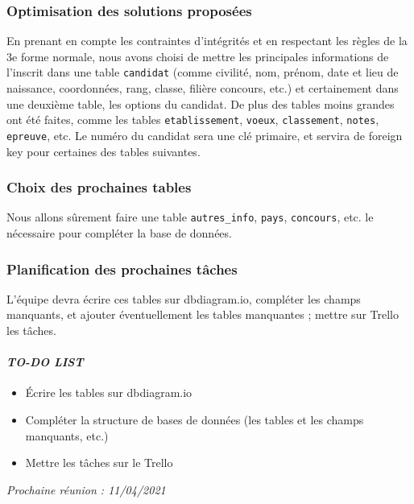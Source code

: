 \subsubsection*{Optimisation des solutions proposées}
En prenant en compte les contraintes d'intégrités et en respectant les règles de la 3e forme normale, nous avons choisi de mettre les principales informations de l'inscrit dans une table \texttt{candidat} (comme civilité, nom, prénom, date et lieu de naissance, coordonnées, rang, classe, filière concours, etc.) et certainement dans une deuxième table, les options du candidat. De plus des tables moins grandes ont été faites, comme les tables \texttt{etablissement}, \texttt{voeux}, \texttt{classement}, \texttt{notes}, \texttt{epreuve}, etc. Le numéro du candidat sera une clé primaire, et servira de foreign key pour certaines des tables suivantes.

\subsubsection*{Choix des prochaines tables}
Nous allons sûrement faire une table \texttt{autres\_info}, \texttt{pays}, \texttt{concours}, etc. le nécessaire pour compléter la base de données.

\subsubsection*{Planification des prochaines tâches}
L'équipe devra écrire ces tables sur \textsf{dbdiagram.io}, compléter les champs manquants, et ajouter éventuellement les tables manquantes ; mettre sur Trello les tâches.


\paragraph{\emph{TO-DO LIST}}
\begin{itemize}
    \item Écrire les tables sur \textsf{dbdiagram.io}
    \item Compléter la structure de bases de données (les tables et les champs manquants, etc.)
    \item Mettre les tâches sur le Trello
\end{itemize}

\emph{Prochaine réunion : 11/04/2021}\\

% 
